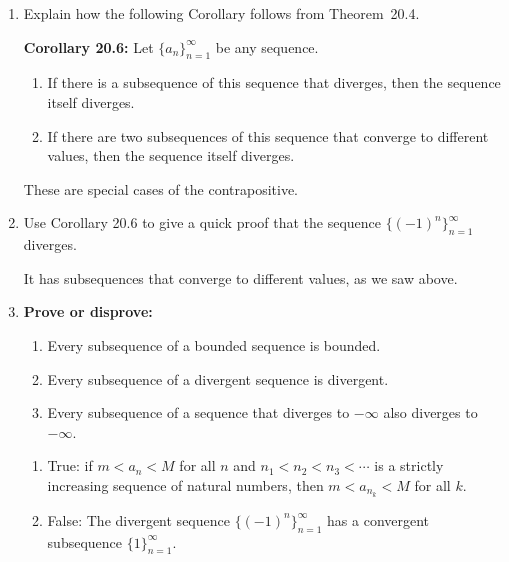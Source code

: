 \documentclass[12pt]{amsart}
\numberwithin{equation}{section}
\theoremstyle{plain} %
\theoremstyle{definition}
\theoremstyle{remark}
\begin{document}
\begin{enumerate}
\item Explain how the following Corollary follows from Theorem~20.4.

\noindent \textbf{Corollary 20.6:} Let $\{a_n\}_{n=1}^\infty$ be any sequence.
\begin{enumerate}
\item If there is a subsequence of this sequence that diverges, then the sequence itself diverges.
\item If there are two subsequences of this sequence that converge to different values, then the sequence itself diverges.
\end{enumerate}

\begin{framed} These are special cases of the contrapositive.
\end{framed}




\item Use Corollary 20.6 to give a quick proof that the sequence $\{ (-1)^n \}_{n=1}^\infty$ diverges.

\begin{framed} It has subsequences that converge to different values, as we saw above.
\end{framed}

\item \textbf{Prove or disprove:}
\begin{enumerate}


\item Every subsequence of a bounded sequence is bounded.



\item Every subsequence of a divergent sequence is divergent.



\item Every subsequence of a sequence that diverges to $-\infty$ also diverges to $-\infty$.
\end{enumerate}

\begin{framed}\begin{enumerate}


\item True: if $m < a_n < M$ for all $n$ and $n_1<n_2 < n_3<\cdots$ is a strictly increasing sequence of natural numbers, then $m < a_{n_k} < M$ for all $k$.


\item False: The divergent sequence $\{(-1)^n\}_{n=1}^\infty$ has a convergent subsequence $\{1\}_{n=1}^\infty$.




\end{enumerate}
\end{framed}
\end{enumerate}
\end{document}
